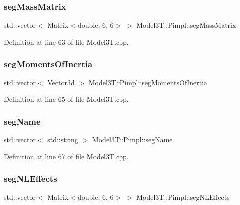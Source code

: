 \subsubsection{\texorpdfstring{seg\+Mass\+Matrix}{segMassMatrix}}
{\footnotesize\ttfamily std\+::vector$<$ Matrix$<$double, 6, 6$>$ $>$ Model3\+T\+::\+Pimpl\+::seg\+Mass\+Matrix}



Definition at line 63 of file Model3\+T.\+cpp.

\hypertarget{structModel3T_1_1Pimpl_a4c64f2048ff9ce34719e3ea2a384a263}{}\label{structModel3T_1_1Pimpl_a4c64f2048ff9ce34719e3ea2a384a263} 
\subsubsection{\texorpdfstring{seg\+Moments\+Of\+Inertia}{segMomentsOfInertia}}
{\footnotesize\ttfamily std\+::vector$<$ Vector3d $>$ Model3\+T\+::\+Pimpl\+::seg\+Moments\+Of\+Inertia}



Definition at line 65 of file Model3\+T.\+cpp.

\hypertarget{structModel3T_1_1Pimpl_a2cab0a9da7f7c37d10152cac8c8e6cfc}{}\label{structModel3T_1_1Pimpl_a2cab0a9da7f7c37d10152cac8c8e6cfc} 
\subsubsection{\texorpdfstring{seg\+Name}{segName}}
{\footnotesize\ttfamily std\+::vector$<$ std\+::string $>$ Model3\+T\+::\+Pimpl\+::seg\+Name}



Definition at line 67 of file Model3\+T.\+cpp.

\hypertarget{structModel3T_1_1Pimpl_a13b0782e9a8fb952f2fa33227277102f}{}\label{structModel3T_1_1Pimpl_a13b0782e9a8fb952f2fa33227277102f} 
\subsubsection{\texorpdfstring{seg\+N\+L\+Effects}{segNLEffects}}
{\footnotesize\ttfamily std\+::vector$<$ Matrix$<$double, 6, 6$>$ $>$ Model3\+T\+::\+Pimpl\+::seg\+N\+L\+Effects}



